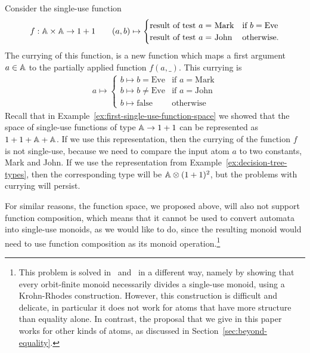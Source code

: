 \begin{example}\label{ex:currying-not-single-use}
    Consider  the single-use function
    \begin{align*}
    f : \mathbb A \times \mathbb A \to 1 + 1 \qquad (a,b)  
    \mapsto \begin{cases}
        \text{result of test $a = $ Mark} & \text{if } b = \text{Eve} \\
        \text{result of test $a = $ John} & \text{otherwise}.
        \end{cases}
    \end{align*}
The currying of this function, is a new function which  maps a first argument $a \in \mathbb A$ to the partially applied function $f(a,\_)$. This currying is
\begin{align*}
    a \mapsto \begin{cases}
        b \mapsto b = \text{Eve} & \text{if } a = \text{Mark} \\
        b \mapsto b \neq \text{Eve} & \text{if } a = \text{John} \\
        b \mapsto \text{false} & \text{otherwise}
        \end{cases}
\end{align*}
Recall that in Example~\ref{ex:first-single-use-function-space} we showed that the space of single-use functions of type $\mathbb A \to 1 + 1$ can be represented as $1 + 1 + \mathbb A + \mathbb A$. If we use this representation,  then the currying of the function $f$  is not single-use, because we need to compare the input atom $a$ to two constants, Mark and John. If we use the representation from Example~\ref{ex:decision-tree-types}, then the corresponding type will be $\mathbb A \otimes (1 + 1)^2$, but the problems with currying will persist. \exampleend
\end{example}

For similar reasons, 
the function space, we proposed above, will also not support function composition, which means that it cannot be used to convert automata into single-use monoids, as we would like to do, since the resulting monoid would need to use function composition as its monoid operation.\footnote{This problem is solved in~\cite{bojanczykstefanski2020} and~\cite{stefanski-phd} in a different way, namely by showing that every orbit-finite monoid necessarily divides a single-use monoid, using a  Krohn-Rhodes construction. However, this construction is difficult and delicate, in particular it does not work for atoms that have more structure than equality alone. In contrast, the proposal that we give in this paper works for other kinds of atoms, as discussed in Section~\ref{sec:beyond-equality}. }


